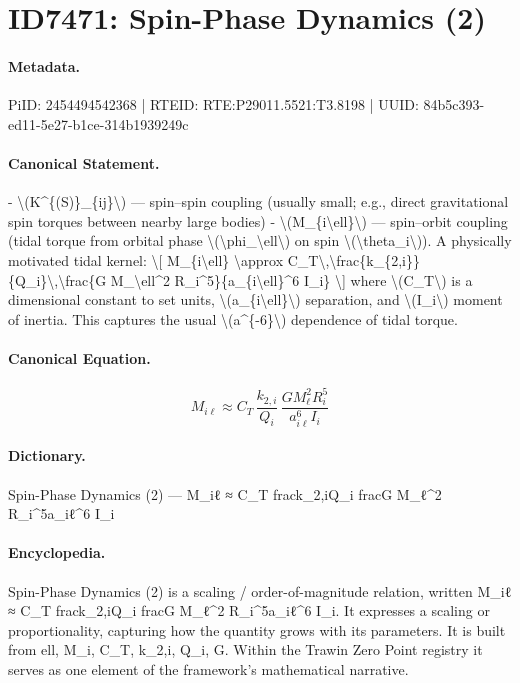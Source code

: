 \section*{ID7471: Spin-Phase Dynamics (2)}
\paragraph{Metadata.}
PiID: 2454494542368 | RTEID: RTE:P29011.5521:T3.8198 | UUID: 84b5c393-ed11-5e27-b1ce-314b1939249c

\paragraph{Canonical Statement.}
- \textbackslash{}(K\textasciicircum{}\{(S)\}\_\{ij\}\textbackslash{}) — spin–spin coupling (usually small; e.g., direct gravitational spin torques between nearby large bodies) - \textbackslash{}(M\_\{i\textbackslash{}ell\}\textbackslash{}) — spin–orbit coupling (tidal torque from orbital phase \textbackslash{}(\textbackslash{}phi\_\textbackslash{}ell\textbackslash{}) on spin \textbackslash{}(\textbackslash{}theta\_i\textbackslash{})). A physically motivated tidal kernel: \textbackslash{}[ M\_\{i\textbackslash{}ell\} \textbackslash{}approx C\_T\textbackslash{},\textbackslash{}frac\{k\_\{2,i\}\}\{Q\_i\}\textbackslash{},\textbackslash{}frac\{G M\_\textbackslash{}ell\textasciicircum{}2 R\_i\textasciicircum{}5\}\{a\_\{i\textbackslash{}ell\}\textasciicircum{}6 I\_i\} \textbackslash{}] where \textbackslash{}(C\_T\textbackslash{}) is a dimensional constant to set units, \textbackslash{}(a\_\{i\textbackslash{}ell\}\textbackslash{}) separation, and \textbackslash{}(I\_i\textbackslash{}) moment of inertia. This captures the usual \textbackslash{}(a\textasciicircum{}\{-6\}\textbackslash{}) dependence of tidal torque.

\paragraph{Canonical Equation.}
\[
M_{i\ell} \approx C_T\,\frac{k_{2,i}}{Q_i}\,\frac{G M_\ell^2 R_i^5}{a_{i\ell}^6 I_i}
\]

\paragraph{Dictionary.}
Spin-Phase Dynamics (2) — M\_iℓ ≈ C\_T frack\_2,iQ\_i fracG M\_ℓ\textasciicircum{}2 R\_i\textasciicircum{}5a\_iℓ\textasciicircum{}6 I\_i

\paragraph{Encyclopedia.}
Spin-Phase Dynamics (2) is a scaling / order-of-magnitude relation, written M\_iℓ ≈ C\_T frack\_2,iQ\_i fracG M\_ℓ\textasciicircum{}2 R\_i\textasciicircum{}5a\_iℓ\textasciicircum{}6 I\_i. It expresses a scaling or proportionality, capturing how the quantity grows with its parameters. It is built from ell, M\_i, C\_T, k\_2,i, Q\_i, G. Within the Trawin Zero Point registry it serves as one element of the framework's mathematical narrative.
